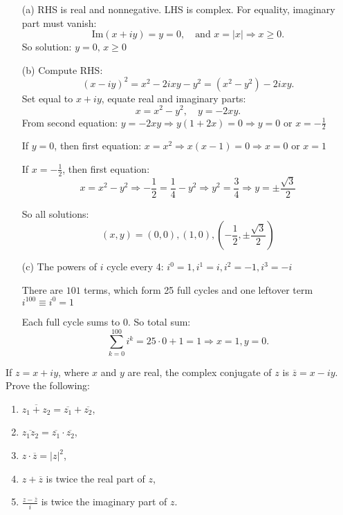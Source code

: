 \begin{itemize}
\item[(a)] RHS is real and nonnegative. LHS is complex. For equality, imaginary part must vanish:
\[
\text{Im}(x + iy) = y = 0, \quad \text{and } x = |x| \Rightarrow x \geq 0.
\]
So solution: \( y = 0,\, x \geq 0 \)

\item[(b)] Compute RHS:
\[
(x - iy)^2 = x^2 - 2ixy - y^2 = (x^2 - y^2) - 2ixy.
\]
Set equal to \( x + iy \), equate real and imaginary parts:
\[
x = x^2 - y^2,\quad y = -2xy.
\]
From second equation: \( y = -2xy \Rightarrow y(1 + 2x) = 0 \Rightarrow y = 0 \) or \( x = -\frac{1}{2} \)

If \( y = 0 \), then first equation: \( x = x^2 \Rightarrow x(x - 1) = 0 \Rightarrow x = 0 \) or \( x = 1 \)

If \( x = -\frac{1}{2} \), then first equation:
\[
x = x^2 - y^2 \Rightarrow -\frac{1}{2} = \frac{1}{4} - y^2 \Rightarrow y^2 = \frac{3}{4} \Rightarrow y = \pm \frac{\sqrt{3}}{2}
\]

So all solutions:
\[
(x,y) = (0,0), (1,0), \left(-\frac{1}{2}, \pm \frac{\sqrt{3}}{2} \right)
\]

\item[(c)] The powers of \( i \) cycle every 4: \( i^0 = 1, i^1 = i, i^2 = -1, i^3 = -i \)

There are \( 101 \) terms, which form 25 full cycles and one leftover term \( i^{100} \equiv i^0 = 1 \)

Each full cycle sums to 0. So total sum:
\[
\sum_{k=0}^{100} i^k = 25 \cdot 0 + 1 = 1
\Rightarrow x = 1, y = 0.
\]
\end{itemize}

\begin{problembox}
If \( z = x + iy \), where \( x \) and \( y \) are real, the complex conjugate of \( z \) is \( \overline{z} = x - iy \). Prove the following:
\begin{enumerate}[label=\alph*)]
\item \( \overline{z_1 + z_2} = \overline{z_1} + \overline{z_2} \),
\item \( \overline{z_1 z_2} = \overline{z_1} \cdot \overline{z_2} \),
\item \( z \cdot \overline{z} = |z|^2 \),
\item \( z + \overline{z} \) is twice the real part of \( z \),
\item \( \frac{z - \overline{z}}{i} \) is twice the imaginary part of \( z \).
\end{enumerate}
\end{problembox}

